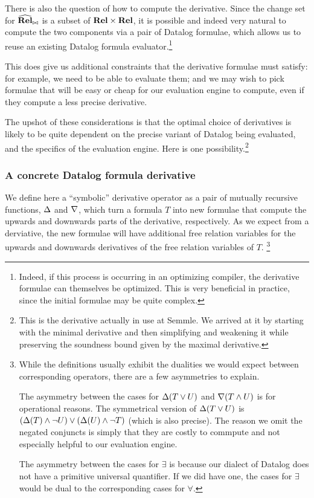 There is also the question of how to compute the derivative. Since the change
set for $\widehat{\mathbf{Rel}}_{\bowtie}$ is a subset of $\mathbf{Rel} \times \mathbf{Rel}$, it
is possible and indeed very natural to compute the two components via a pair of
Datalog formulae, which allows us to reuse an existing Datalog formula
evaluator.\footnote{
  Indeed, if this process is occurring in an optimizing compiler,
  the derivative formulae can themselves be optimized. This is very 
  beneficial in practice, since the initial formulae may be quite complex.}

This does give us additional constraints that the derivative formulae must satisfy:
for example, we need to be able to evaluate them; and we may wish to pick formulae that will be easy or cheap
for our evaluation engine to compute, even if they compute a less precise derivative.

The upshot of these considerations is that the optimal choice of derivatives is likely
to be quite dependent on the precise variant of Datalog being evaluated, and the
specifics of the evaluation engine. Here is one possibility.\footnote{This is
  the derivative actually in use at Semmle. We arrived at it by starting with the
  minimal derivative and then simplifying and weakening it while preserving the
  soundness bound given by the maximal derivative.}

\subsubsection{A concrete Datalog formula derivative}

We define here a ``symbolic'' derivative operator as a pair of mutually recursive functions,
$\Delta$ and $\nabla$, which turn a formula $T$ into new formulae that compute
the upwards and downwards parts of the derivative, respectively. As we expect
from a derviative, the new formulae will have additional free relation variables
for the upwards and downwards derivatives of the free relation variables of $T$.
\footnote{While the definitions usually exhibit the dualities we would expect
  between corresponding operators, there are a few asymmetries to explain.

  The asymmetry between the cases for $\Delta(T \vee U)$ and
  $\nabla(T \wedge U)$ is for operational reasons. The symmetrical version of
  $\Delta(T \vee U)$ is $(\Delta(T) \wedge \neg U) \vee (\Delta(U) \wedge \neg
  T)$ (which is also precise). The reason we omit the negated conjuncts is simply
  that they are costly to commpute and not especially helpful to our evaluation engine.

  The asymmetry between the cases for $\exists$ is because our
  dialect of Datalog does not have a primitive universal quantifier.
  If we did have one, the cases for $\exists$ would be dual to the corresponding
  cases for $\forall$.}

